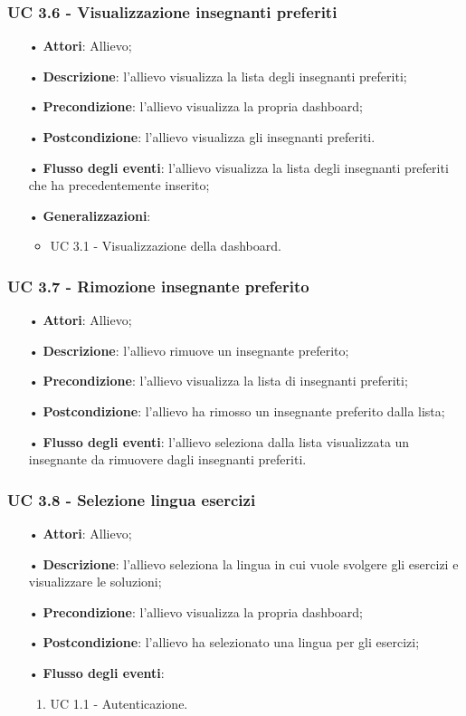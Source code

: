 \subsubsection{UC 3.6 - Visualizzazione insegnanti preferiti}
\begin{itemize}
	\item[•]\textbf{Attori}: Allievo;
	\item[•]\textbf{Descrizione}: l'allievo visualizza la lista degli insegnanti preferiti;
	\item[•]\textbf{Precondizione}: l'allievo visualizza la propria dashboard;
	\item[•]\textbf{Postcondizione}: l'allievo visualizza gli insegnanti preferiti.
	\item[•]\textbf{Flusso degli eventi}: l'allievo visualizza la lista degli insegnanti preferiti che ha precedentemente inserito;
	\item[•]\textbf{Generalizzazioni}:
\begin{itemize}
\item UC 3.1 - Visualizzazione della dashboard.
\end{itemize}
\end{itemize}

\subsubsection{UC 3.7 - Rimozione insegnante preferito}
\begin{itemize}
	\item[•]\textbf{Attori}: Allievo;
	\item[•]\textbf{Descrizione}: l'allievo rimuove un insegnante preferito;
	\item[•]\textbf{Precondizione}: l'allievo visualizza la lista di insegnanti preferiti;
	\item[•]\textbf{Postcondizione}: l'allievo ha rimosso un insegnante preferito dalla lista;
	\item[•]\textbf{Flusso degli eventi}: l'allievo seleziona dalla lista visualizzata un insegnante da rimuovere dagli insegnanti preferiti.
\end{itemize}

\subsubsection{UC 3.8 - Selezione lingua esercizi}
\begin{itemize}
	\item[•]\textbf{Attori}: Allievo;
	\item[•]\textbf{Descrizione}: l'allievo seleziona la lingua in cui vuole svolgere gli esercizi e visualizzare le soluzioni;
	\item[•]\textbf{Precondizione}: l'allievo visualizza la propria dashboard;
	\item[•]\textbf{Postcondizione}: l'allievo ha selezionato una lingua per gli esercizi;
	\item[•]\textbf{Flusso degli eventi}: 
	\begin{enumerate}
		\item UC 1.1 - Autenticazione.
	\end{enumerate}
\end{itemize}

